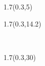 \begingroup

\textblockorigin{0mm}{0mm}

\begin{textblock*}{1.7\TPHorizModule}(0.3\TPHorizModule,5\TPVertModule)
  \begin{minipage}{\textwidth}
    \theauthor
  \end{minipage}
\end{textblock*}

\begin{textblock*}{1.7\TPHorizModule}(0.3\TPHorizModule,14.2\TPVertModule)
  \begin{minipage}{\textwidth}
    \thetitle \\
  \end{minipage}
\end{textblock*}

\begin{textblock*}{1.7\TPHorizModule}(0.3\TPHorizModule,30\TPVertModule)
  \begin{minipage}{\textwidth}
    \thedate
  \end{minipage}
\end{textblock*}

\endgroup

